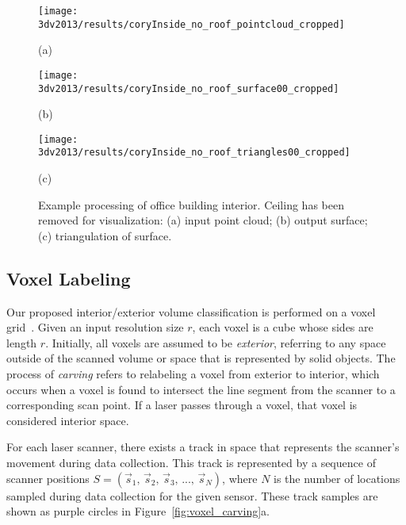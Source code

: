 \documentclass[12pt,onecolumn,oneside]{book}
\begin{document}
\begin{figure}[p]

	\centering
	\begin{minipage}[b]{0.75\linewidth}
	\centerline{\texttt{[image: 3dv2013/results/coryInside\_no\_roof\_pointcloud\_cropped]}}
	\centerline{(a)}\medskip
	\end{minipage}
	\hfill
	\begin{minipage}[b]{0.75\linewidth}
	\centerline{\texttt{[image: 3dv2013/results/coryInside\_no\_roof\_surface00\_cropped]}}
	\centerline{(b)}\medskip
	\end{minipage}
	\hfill
	\begin{minipage}[b]{0.75\linewidth}
	\centerline{\texttt{[image: 3dv2013/results/coryInside\_no\_roof\_triangles00\_cropped]}}
	\centerline{(c)}\medskip
	\end{minipage}

\caption[Processing of an office building interior.]{Example processing of office building interior.  Ceiling has been removed for visualization:  (a) input point cloud; (b) output surface; (c) triangulation of surface.}
\label{fig:3dv2013_mydesk}
\end{figure}

\subsection{Voxel Labeling}
\label{ssec:voxel_labeling}

Our proposed interior/exterior volume classification is performed on a voxel grid~\cite{Turner13}.  Given an input resolution size $r$, each voxel is a cube whose sides are length $r$.  Initially, all voxels are assumed to be {\it exterior}, referring to any space outside of the scanned volume or space that is represented by solid objects.  The process of {\it carving} refers to relabeling a voxel from exterior to interior, which occurs when a voxel is found to intersect the line segment from the scanner to a corresponding scan point.  If a laser passes through a voxel, that voxel is considered interior space.

For each laser scanner, there exists a track in space that represents the scanner's movement during data collection.  This track is represented by a sequence of scanner positions $S = (\vec{s}_{1},\,\vec{s}_{2},\,\vec{s}_{3},\,...,\,\vec{s}_{N})$, where $N$ is the number of locations sampled during data collection for the given sensor.  These track samples are shown as purple circles in Figure~\ref{fig:voxel_carving}a.
\end{document}
